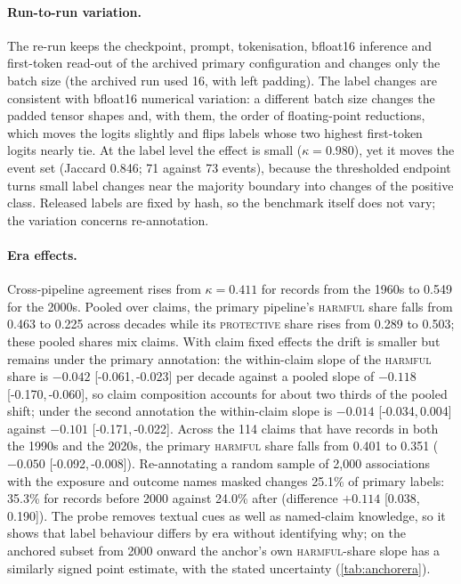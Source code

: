 \documentclass[11pt]{article}
\newcommand{\ci}[2]{[#1,\,#2]}
\begin{document}
\paragraph{Run-to-run variation.} The re-run keeps the checkpoint, prompt, tokenisation, bfloat16
inference and first-token read-out of the archived primary configuration and changes only the batch
size (the archived run used 16, with left padding). The label changes are consistent with bfloat16
numerical variation: a different batch size changes the padded tensor shapes and, with them, the
order of floating-point reductions, which moves the logits slightly and flips labels whose two highest
first-token logits nearly tie. At the label level the effect is small ($\kappa=0.980$), yet it moves
the event set (Jaccard 0.846; 71 against 73 events), because the thresholded endpoint turns small
label changes near the majority boundary into changes of the positive class. Released labels are fixed
by hash, so the benchmark itself does not vary; the variation concerns re-annotation.

\paragraph{Era effects.} Cross-pipeline agreement rises from $\kappa=0.411$ for records from the
1960s to 0.549 for the 2000s. Pooled over claims, the primary pipeline's \textsc{harmful} share falls
from 0.463 to 0.225 across decades while its \textsc{protective} share rises from 0.289 to 0.503;
these pooled shares mix claims. With claim fixed effects the drift is smaller but remains under the
primary annotation: the within-claim slope of the \textsc{harmful} share is $-0.042$
\ci{-0.061}{-0.023} per decade against a pooled slope of $-0.118$ \ci{-0.170}{-0.060}, so claim
composition accounts for about two thirds of the pooled shift; under the second annotation the
within-claim slope is $-0.014$ \ci{-0.034}{0.004} against $-0.101$ \ci{-0.171}{-0.022}. Across the
114 claims that have records in both the 1990s and the 2020s, the primary \textsc{harmful} share falls
from 0.401 to 0.351 ($-0.050$ \ci{-0.092}{-0.008}). Re-annotating a random sample
of 2{,}000 associations with the exposure and outcome names masked changes 25.1\% of primary labels: 35.3\%
for records before 2000 against 24.0\% after (difference $+0.114$ \ci{0.038}{0.190}). The probe
removes textual cues as well as named-claim knowledge, so it shows that label behaviour differs by
era without identifying why; on the anchored subset from 2000 onward the anchor's own
\textsc{harmful}-share slope has a similarly signed point estimate, with the stated uncertainty
(\cref{tab:anchorera}).
\end{document}
